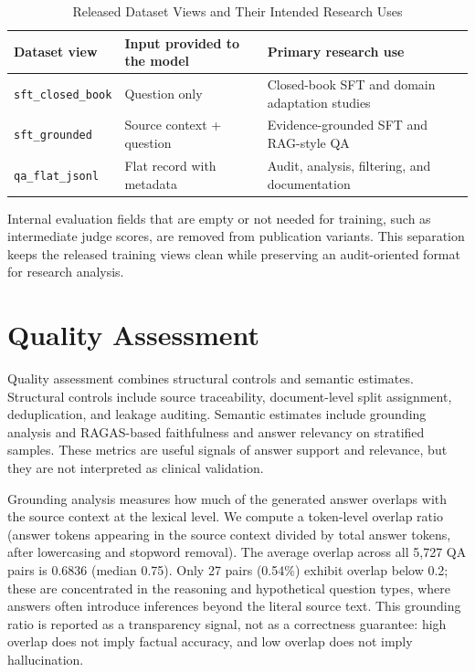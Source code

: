 \documentclass[conference]{IEEEtran}
\begin{document}
\begin{table}[t]
\caption{Released Dataset Views and Their Intended Research Uses}
\label{tab:variants}
\centering
\scriptsize
\begin{tabular}{|p{}|p{}|p{}|}
\hline
\textbf{Dataset view} & \textbf{Input provided to the model} & \textbf{Primary research use} \\
\hline
\texttt{sft\_closed\_book} & Question only & Closed-book SFT and domain adaptation studies \\
\hline
\texttt{sft\_grounded} & Source context + question & Evidence-grounded SFT and RAG-style QA \\
\hline
\texttt{qa\_flat\_jsonl} & Flat record with metadata & Audit, analysis, filtering, and documentation \\
\hline
\end{tabular}
\end{table}

Internal evaluation fields that are empty or not needed for training, such as intermediate judge scores, are removed from publication variants. This separation keeps the released training views clean while preserving an audit-oriented format for research analysis.

\section{Quality Assessment}
Quality assessment combines structural controls and semantic estimates. Structural controls include source traceability, document-level split assignment, deduplication, and leakage auditing. Semantic estimates include grounding analysis and RAGAS-based faithfulness and answer relevancy on stratified samples. These metrics are useful signals of answer support and relevance, but they are not interpreted as clinical validation.

Grounding analysis measures how much of the generated answer overlaps with the source context at the lexical level. We compute a token-level overlap ratio (answer tokens appearing in the source context divided by total answer tokens, after lowercasing and stopword removal). The average overlap across all 5,727 QA pairs is 0.6836 (median 0.75). Only 27 pairs (0.54\%) exhibit overlap below 0.2; these are concentrated in the reasoning and hypothetical question types, where answers often introduce inferences beyond the literal source text. This grounding ratio is reported as a transparency signal, not as a correctness guarantee: high overlap does not imply factual accuracy, and low overlap does not imply hallucination.
\end{document}
